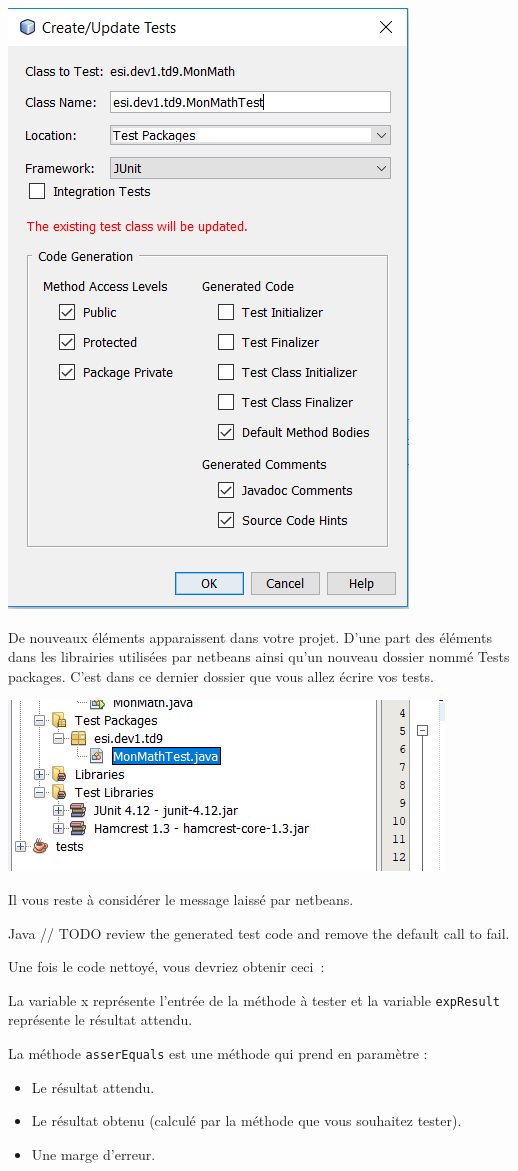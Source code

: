 \documentclass[a4paper,11pt]{article}
\begin{document}
	\begin{center}
		\includegraphics[width=.5\textwidth]{images/config_tests.png}
	\end{center}

	De nouveaux éléments apparaissent dans votre
	projet. D’une part des éléments dans les librairies utilisées par netbeans ainsi qu’un nouveau dossier nommé Tests packages. C’est dans ce dernier dossier que vous allez écrire vos tests.

	\begin{center}
		\includegraphics[width=.5\textwidth]{images/libraries.png}
	\end{center}

	Il vous reste à considérer le message laissé par netbeans.
	\begin{Code}{Java}
		// TODO review the generated test code and remove the default call to fail.
	\end{Code}

	Une fois le code nettoyé, vous devriez obtenir ceci~:

	La variable x représente l’entrée de la méthode à tester et la variable \texttt{expResult} représente le résultat attendu.

	La méthode \texttt{asserEquals} est une méthode qui prend en paramètre :
	\begin{itemize}
		\item Le résultat attendu.
		\item Le résultat obtenu (calculé par la méthode que vous souhaitez tester).
		\item Une marge d’erreur.
	\end{itemize}
\end{document}
